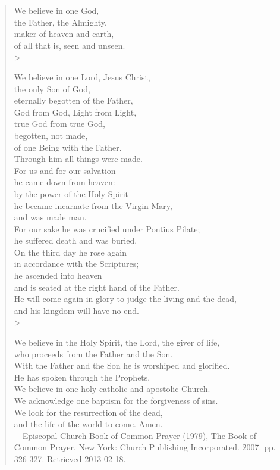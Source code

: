\documentclass{article}
\begin{document}
\begin{verse}
We believe in one God, \\
the Father, the Almighty, \\
maker of heaven and earth, \\
of all that is, seen and unseen. \\>

We believe in one Lord, Jesus Christ, \\
the only Son of God, \\
eternally begotten of the Father, \\
God from God, Light from Light, \\
true God from true God, \\
begotten, not made, \\
of one Being with the Father. \\
Through him all things were made. \\
For us and for our salvation \\
he came down from heaven: \\
by the power of the Holy Spirit \\
he became incarnate from the Virgin Mary, \\
and was made man. \\
For our sake he was crucified under Pontius Pilate; \\
he suffered death and was buried. \\
On the third day he rose again \\
in accordance with the Scriptures; \\
he ascended into heaven \\
and is seated at the right hand of the Father. \\
He will come again in glory to judge the living and the dead, \\
and his kingdom will have no end. \\>

We believe in the Holy Spirit, the Lord, the giver of life, \\
who proceeds from the Father and the Son. \\
With the Father and the Son he is worshiped and glorified. \\
He has spoken through the Prophets. \\
We believe in one holy catholic and apostolic Church. \\
We acknowledge one baptism for the forgiveness of sins. \\
We look for the resurrection of the dead, \\
and the life of the world to come. Amen. \\

\hfill{---Episcopal Church Book of Common Prayer (1979), The Book of Common Prayer. New York: Church Publishing Incorporated. 2007. pp. 326-327. Retrieved 2013-02-18.}
\end{verse}
\end{document}
